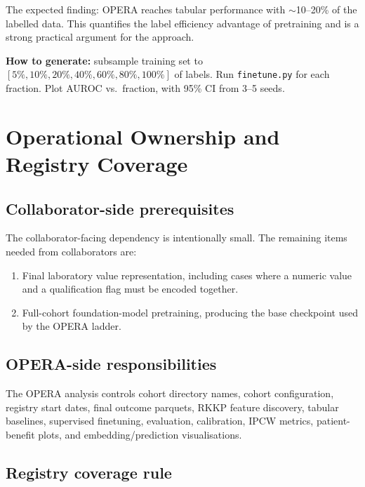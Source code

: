 \documentclass[11pt, a4paper]{article}
\newcommand{\code}[1]{\texttt{\small #1}}
\begin{document}
The expected finding: OPERA reaches tabular performance with $\sim$10--20\%
of the labelled data. This quantifies the label efficiency advantage of
pretraining and is a strong practical argument for the approach.

\medskip
\begin{tcolorbox}[notebox]
  \textbf{How to generate:} subsample training set to $[5\%, 10\%, 20\%,
  40\%, 60\%, 80\%, 100\%]$ of labels. Run \code{finetune.py} for each
  fraction. Plot AUROC vs.\ fraction, with 95\% CI from 3--5 seeds.
\end{tcolorbox}

\section{Operational Ownership and Registry Coverage}

\subsection{Collaborator-side prerequisites}

The collaborator-facing dependency is intentionally small. The remaining
items needed from collaborators are:

\begin{enumerate}[leftmargin=2em, itemsep=2pt]
  \item Final laboratory value representation, including cases where a
        numeric value and a qualification flag must be encoded together.
  \item Full-cohort foundation-model pretraining, producing the base
        checkpoint used by the OPERA ladder.
\end{enumerate}

\subsection{OPERA-side responsibilities}

The OPERA analysis controls cohort directory names, cohort configuration,
registry start dates, final outcome parquets, RKKP feature discovery,
tabular baselines, supervised finetuning, evaluation, calibration, IPCW
metrics, patient-benefit plots, and embedding/prediction visualisations.

\subsection{Registry coverage rule}
\end{document}
